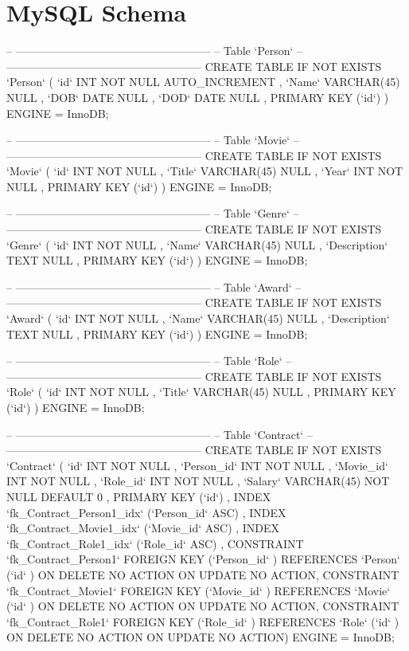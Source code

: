 \section{MySQL Schema}
\begin{spverbatim}
-- -----------------------------------------------------
-- Table `Person`
-- -----------------------------------------------------
CREATE  TABLE IF NOT EXISTS `Person` (
  `id` INT NOT NULL AUTO_INCREMENT ,
  `Name` VARCHAR(45) NULL ,
  `DOB` DATE NULL ,
  `DOD` DATE NULL ,
  PRIMARY KEY (`id`) )
ENGINE = InnoDB;


-- -----------------------------------------------------
-- Table `Movie`
-- -----------------------------------------------------
CREATE  TABLE IF NOT EXISTS `Movie` (
  `id` INT NOT NULL ,
  `Title` VARCHAR(45) NULL ,
  `Year` INT NOT NULL ,
  PRIMARY KEY (`id`) )
ENGINE = InnoDB;


-- -----------------------------------------------------
-- Table `Genre`
-- -----------------------------------------------------
CREATE  TABLE IF NOT EXISTS `Genre` (
  `id` INT NOT NULL ,
  `Name` VARCHAR(45) NULL ,
  `Description` TEXT NULL ,
  PRIMARY KEY (`id`) )
ENGINE = InnoDB;


-- -----------------------------------------------------
-- Table `Award`
-- -----------------------------------------------------
CREATE  TABLE IF NOT EXISTS `Award` (
  `id` INT NOT NULL ,
  `Name` VARCHAR(45) NULL ,
  `Description` TEXT NULL ,
  PRIMARY KEY (`id`) )
ENGINE = InnoDB;


-- -----------------------------------------------------
-- Table `Role`
-- -----------------------------------------------------
CREATE  TABLE IF NOT EXISTS `Role` (
  `id` INT NOT NULL ,
  `Title` VARCHAR(45) NULL ,
  PRIMARY KEY (`id`) )
ENGINE = InnoDB;


-- -----------------------------------------------------
-- Table `Contract`
-- -----------------------------------------------------
CREATE  TABLE IF NOT EXISTS `Contract` (
  `id` INT NOT NULL ,
  `Person_id` INT NOT NULL ,
  `Movie_id` INT NOT NULL ,
  `Role_id` INT NOT NULL ,
  `Salary` VARCHAR(45) NOT NULL DEFAULT 0 ,
  PRIMARY KEY (`id`) ,
  INDEX `fk_Contract_Person1_idx` (`Person_id` ASC) ,
  INDEX `fk_Contract_Movie1_idx` (`Movie_id` ASC) ,
  INDEX `fk_Contract_Role1_idx` (`Role_id` ASC) ,
  CONSTRAINT `fk_Contract_Person1`
    FOREIGN KEY (`Person_id` )
    REFERENCES `Person` (`id` )
    ON DELETE NO ACTION
    ON UPDATE NO ACTION,
  CONSTRAINT `fk_Contract_Movie1`
    FOREIGN KEY (`Movie_id` )
    REFERENCES `Movie` (`id` )
    ON DELETE NO ACTION
    ON UPDATE NO ACTION,
  CONSTRAINT `fk_Contract_Role1`
    FOREIGN KEY (`Role_id` )
    REFERENCES `Role` (`id` )
    ON DELETE NO ACTION
    ON UPDATE NO ACTION)
ENGINE = InnoDB;



\end{spverbatim}
